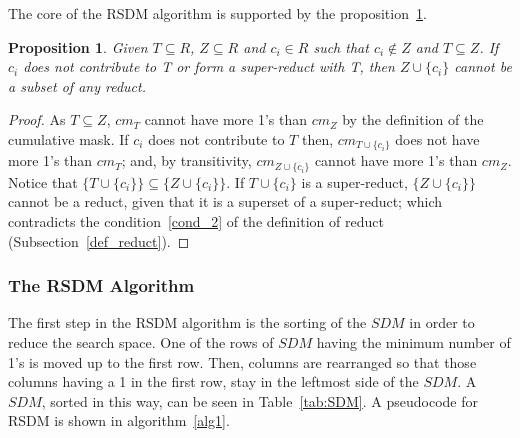 \documentclass[authoryear,11pt]{elsarticle}
\newtheorem{proposition}{Proposition}
\newtheorem{proof}{Proof}
\begin{document}
	The core of the RSDM algorithm is supported by the proposition~\ref{prop3}.		
	
	\begin{proposition}\label{prop3} 
		Given $T \subseteq R$, $Z \subseteq R$ and  $c_i \in R$ such that $c_i \notin Z$ and $T \subseteq Z$. If 
		$c_i$ does not contribute to T or form a super-reduct with T, then $Z\cup\{c_i\}$ cannot be a subset of any 
		reduct.
	\end{proposition}	
	
	\begin{proof}
		As $T \subseteq Z$, $cm_T$ cannot have more 1's than $cm_Z$ by the definition of the cumulative mask.
		If $c_i$ does not contribute to $T$ then, $cm_{T \cup \lbrace c_i \rbrace}$ does not have more 1's than
		$cm_T$; and, by transitivity, $cm_{Z \cup \lbrace c_i \rbrace}$ cannot have more 1's than $cm_Z$. 
		Notice that  $\lbrace T \cup \lbrace c_i \rbrace\rbrace \subseteq \lbrace Z \cup \lbrace c_i
		\rbrace\rbrace$.
		If $T \cup \lbrace c_i \rbrace$ is a super-reduct, $\lbrace Z \cup \lbrace c_i \rbrace\rbrace$ cannot be a 
		reduct, given that it is a superset of a super-reduct; which contradicts the condition~\ref{cond_2} of the
		definition of reduct (Subsection~\ref{def_reduct}).
	\end{proof}


\subsubsection{The RSDM Algorithm}
%
	The first step in the RSDM algorithm is the sorting of the $SDM$ in order to reduce the search space. One of 
	the rows of $SDM$ having the minimum number of 1's is moved up to the first row. Then, columns are rearranged 
	so that those columns having a 1 in the first row, stay in the leftmost side of the $SDM$. A $SDM$, sorted in 
	this way, can be seen in Table~\ref{tab:SDM}. A pseudocode for RSDM is shown in algorithm~\ref{alg1}. 
	
\end{document}
